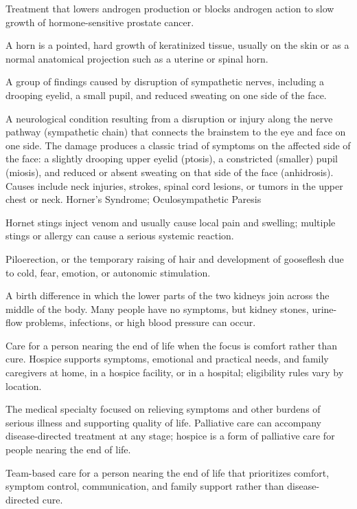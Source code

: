 Treatment that lowers androgen production or blocks androgen action to slow growth of hormone-sensitive prostate cancer.

 A horn is a pointed, hard growth of keratinized tissue, usually on the skin or as a normal anatomical projection such as a uterine or spinal horn.

 A group of findings caused by disruption of sympathetic nerves, including a drooping eyelid, a small pupil, and reduced sweating on one side of the face.

 A neurological condition resulting from a disruption or injury along the nerve pathway (sympathetic chain) that connects the brainstem to the eye and face on one side. The damage produces a classic triad of symptoms on the affected side of the face: a slightly drooping upper eyelid (ptosis), a constricted (smaller) pupil (miosis), and reduced or absent sweating on that side of the face (anhidrosis). Causes include neck injuries, strokes, spinal cord lesions, or tumors in the upper chest or neck.
\synonyms
Horner's Syndrome; Oculosympathetic Paresis

 Hornet stings inject venom and usually cause local pain and swelling; multiple stings or allergy can cause a serious systemic reaction.

 Piloerection, or the temporary raising of hair and development of gooseflesh due to cold, fear, emotion, or autonomic stimulation.

 A birth difference in which the lower parts of the two kidneys join across the middle of the body. Many people have no symptoms, but kidney stones, urine-flow problems, infections, or high blood pressure can occur.

 Care for a person nearing the end of life when the focus is comfort rather than cure. Hospice supports symptoms, emotional and practical needs, and family caregivers at home, in a hospice facility, or in a hospital; eligibility rules vary by location.

 The medical specialty focused on relieving symptoms and other
burdens of serious illness and supporting quality of life. Palliative care can accompany
disease-directed treatment at any stage; hospice is a form of palliative care for people
nearing the end of life.

 Team-based care for a person nearing the end of life that prioritizes comfort, symptom control, communication, and family support rather than disease-directed cure.

